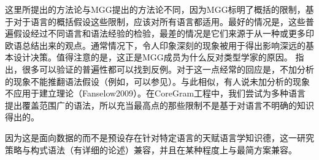 这里所提出的方法论与MGG提出的方法论不同，因为MGG标明了概括的限制，基于对于语言的概括假设这些限制，应该对所有语言都适用。最好的情况是，这些普遍假设经过不同语言和语法经验的检验，最差的情况是它们来源于从一种或更多印欧语总结出来的观点。通常情况下，令人印象深刻的现象被用于得出影响深远的基本设计决策\citep{Fanselow2009a,SR2012a,Haider2016a}。值得注意的是，这正是MGG成员为什么反对类型学家的原因。 \citet{EL2009a}指出，很多可以验证的普遍性都可以找到反例。对于这一点经常的回应是，不加分析的现象不能推翻语法假设（例如，可以参见\citealp[]{Freidin2009a}）。与此相似，有人说未加分析的现象不应用于建立理论（Fanselow2009）。在CoreGram工程中，我们尝试为多种语言提出覆盖范围广的语法，所以充当最高点的那些限制不是基于对语言不明确的知识得出的。

因为这是面向数据的而不是预设存在针对特定语言的天赋语言学知识德，这一研究策略与构式语法（\citealp[]{Goldberg2013b}有详细的论述）兼容，并且在某种程度上与最简方案兼容。


